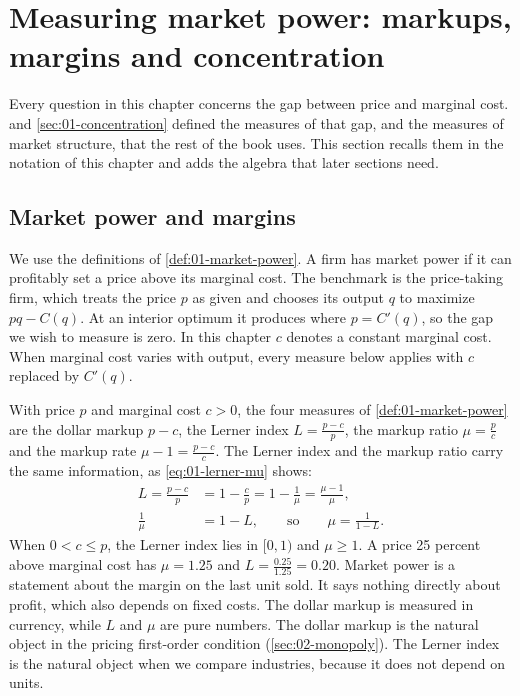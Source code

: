 \section{Measuring market power: markups, margins and concentration}\label{sec:02-measures}

Every question in this chapter concerns the gap between price and marginal cost.  and
\cref{sec:01-concentration} defined the measures of that gap, and the measures of market structure, that the rest
of the book uses. This section recalls them in the notation of this chapter and adds the algebra that later
sections need.

\subsection{Market power and margins}\label{sec:02-margins}

We use the definitions of \cref{def:01-market-power}. A firm has market power if it can profitably set a price
above its marginal cost. The benchmark is the price-taking firm, which treats the price $p$ as given and chooses
its output $q$ to maximize $pq - C(q)$. At an interior optimum it produces where $p = C'(q)$, so the gap we wish to
measure is zero. In this chapter $c$ denotes a constant marginal cost. When marginal cost varies with output, every
measure below applies with $c$ replaced by $C'(q)$.

With price $p$ and marginal cost $c > 0$, the four measures of \cref{def:01-market-power} are the dollar markup
$p - c$, the Lerner index $L = \frac{p - c}{p}$, the markup ratio $\mu = \frac{p}{c}$ and the markup rate
$\mu - 1 = \frac{p - c}{c}$. The Lerner index and the markup ratio carry the same information, as
\eqref{eq:01-lerner-mu} shows:
\begin{align*}
  L = \frac{p - c}{p} &= 1 - \frac{c}{p} = 1 - \frac{1}{\mu} = \frac{\mu - 1}{\mu}, \\
  \frac{1}{\mu} &= 1 - L, \qquad\text{so}\qquad \mu = \frac{1}{1 - L} .
\end{align*}
When $0 < c \le p$, the Lerner index lies in $[0, 1)$ and $\mu \ge 1$. A price 25 percent above marginal cost has
$\mu = 1.25$ and $L = \frac{0.25}{1.25} = 0.20$. Market power is a statement about the margin on the last unit sold.
It says nothing directly about profit, which also depends on fixed costs. The dollar markup is measured in
currency, while $L$ and $\mu$ are pure numbers. The dollar markup is the natural object in the pricing first-order
condition (\cref{sec:02-monopoly}). The Lerner index is the natural object when we compare industries, because it
does not depend on units.

